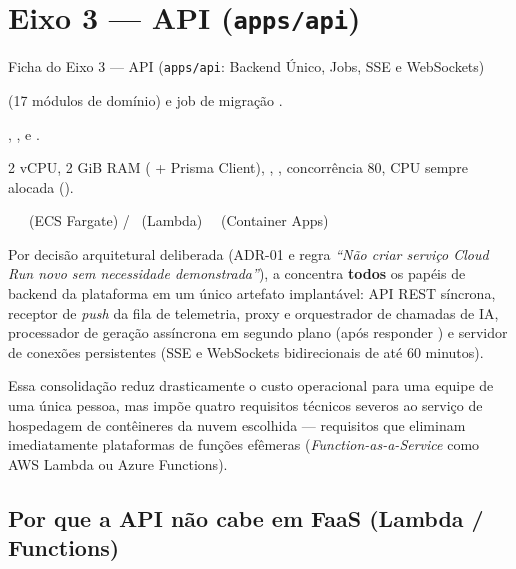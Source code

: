 \chapter{Eixo 3 --- API (\texttt{apps/api})}
\label{cap:eixo-api}

\begin{fichaeixo}{Ficha do Eixo 3 --- API (\texttt{apps/api}: Backend Único, Jobs, SSE e WebSockets)}
\begin{campos}
  \item[Serviços no código]  (17 módulos de domínio) e job de migração .
  \item[Arquivos Terraform] , ,  e .
  \item[Dimensionamento atual] 2 vCPU, 2 GiB RAM ( + Prisma Client), , , concorrência 80, CPU sempre alocada ().
  \item[Aderência por nuvem] \sgcp~\nativo \quad \saws~\equivalente\ (ECS Fargate) / \incompativel\ (Lambda) \quad \sazure~\nativo\ (Container Apps)
\end{campos}
\end{fichaeixo}

Por decisão arquitetural deliberada (ADR-01 e regra \emph{``Não criar serviço Cloud Run novo sem necessidade demonstrada''}), a  concentra \textbf{todos} os papéis de backend da plataforma em um único artefato implantável: API REST síncrona, receptor de \emph{push} da fila de telemetria, proxy e orquestrador de chamadas de IA, processador de geração assíncrona em segundo plano (após responder ) e servidor de conexões persistentes (SSE e WebSockets bidirecionais de até 60 minutos).

Essa consolidação reduz drasticamente o custo operacional para uma equipe de uma única pessoa, mas impõe quatro requisitos técnicos severos ao serviço de hospedagem de contêineres da nuvem escolhida --- requisitos que eliminam imediatamente plataformas de funções efêmeras (\emph{Function-as-a-Service} como AWS Lambda ou Azure Functions).

\section{Por que a API não cabe em FaaS (Lambda / Functions)}
\label{sec:api-requisitos-computacao}

